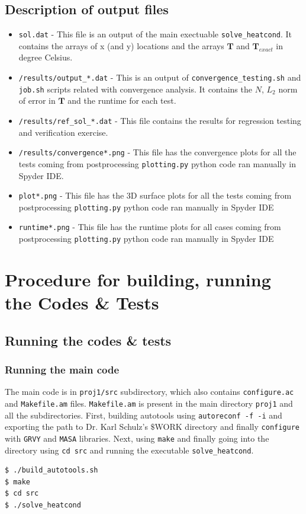 \documentclass[12pt]{amsart}   %
\begin{document}
\subsection{Description of output files}
\begin{itemize}
    \item {\tt{sol.dat}} - This file is an output of the main exectuable {\tt{solve\_heatcond}}. It contains the arrays of x (and y) locations and the arrays $\textbf{T}$ and $\textbf{T}_{exact}$ in degree Celsius.
    \item {\tt{/results/output\_*.dat}} - This is an output of {\tt{convergence\_testing.sh}} and {\tt{job.sh}} scripts related with convergence analysis. It contains the $N$, $L_2$ norm of error in $\textbf{T}$ and the runtime for each test.
    \item {\tt{/results/ref\_sol\_*.dat}} - This file contains the results for regression testing and verification exercise.
    \item {\tt{/results/convergence*.png}} - This file has the convergence plots for all the tests coming from postprocessing {\tt{plotting.py}} python code ran manually in Spyder IDE.
    \item {\tt{plot*.png}} - This file has the 3D surface plots for all the tests coming from postprocessing {\tt{plotting.py}} python code ran manually in Spyder IDE
    \item {\tt{runtime*.png}} - This file has the runtime plots for all cases coming from postprocessing {\tt{plotting.py}} python code ran manually in Spyder IDE
    \end{itemize}

\section{Procedure for building, running the Codes \& Tests}
\newline
\subsection{Running the codes \& tests}\label{subsec:runningcode} 
\subsubsection{Running the main code}
The main code is in {\tt{proj1/src}} subdirectory, which also contains {\tt{configure.ac}} and {\tt{Makefile.am}} files. {\tt{Makefile.am}} is present in the main directory {\tt{proj1}} and all the subdirectories.
First, building autotools using {\tt{autoreconf -f -i}} and exporting the path to Dr. Karl Schulz's $\$$WORK directory and finally {\tt{configure}} with {\tt{GRVY}} and {\tt{MASA}} libraries. Next, using {\tt{make}} and finally going into the directory using {\tt{cd src}} and running the executable {\tt{solve\_heatcond}}.
\begin{lstlisting}
$ ./build_autotools.sh
$ make
$ cd src
$ ./solve_heatcond  
\end{lstlisting}
\end{document}
